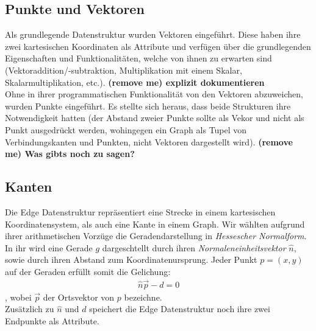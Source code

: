 \documentclass[a4paper,twocolumn]{scrartcl}
\newcommand{\lststyle}[1]{{\usefont{T1}{pcr}{m}{n}\small\selectfont#1}}
\begin{document}
\subsection{Punkte und Vektoren}
Als grundlegende Datenstruktur wurden Vektoren eingef\"uhrt. Diese haben ihre zwei kartesischen Koordinaten als
Attribute und verf\"ugen \"uber die grundlegenden Eigenschaften und Funktionalit\"aten, welche von ihnen zu erwarten sind
(Vektoraddition/-subtraktion,
Multiplikation mit einem Skalar, Skalarmultiplikation, etc.). \textbf{(remove me) explizit dokumentieren}\\
Ohne in ihrer programmatischen Funktionalit\"at von den Vektoren abzuweichen, wurden Punkte eingef\"uhrt. Es stellte
sich heraus, dass beide Strukturen ihre Notwendigkeit hatten (der Abstand zweier Punkte sollte
als Vekor und 
nicht als Punkt ausgedr\"uckt werden, wohingegen ein Graph als Tupel von Verbindungskanten und Punkten, nicht Vektoren
dargestellt wird).
\textbf{(remove me) Was gibts noch zu sagen?}
\subsection{Kanten}
Die \lststyle{Edge} Datenstruktur repr\"asentiert eine  Strecke in einem kartesischen Koordinatensystem, als auch eine
Kante in einem Graph. Wir w\"ahlten aufgrund ihrer arithmetischen Vorz\"uge die Geradendarstellung in \emph{Hessescher
Normalform}. In ihr wird eine Gerade $g$ dargeschtellt durch ihren \emph{Normaleneinheitsvektor} $\widehat{n}$, sowie
durch ihren Abstand zum Koordinatenursprung. Jeder Punkt $p=(x,y)$ auf der Geraden erf\"ullt somit die Gelichung: 
\begin{align}
  \widehat{n}\vec{p}-d=0  
\end{align}
, wobei $\vec{p}$ der Ortsvektor von $p$ bezeichne.\\
Zus\"atzlich zu $\widehat{n}$ und $d$ speichert die \lststyle{Edge} Datenstruktur noch ihre zwei Endpunkte als
Attribute.
\end{document}
